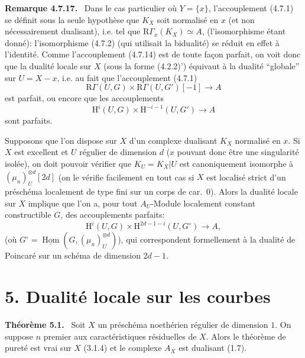 \documentclass[11pt]{article}
\newenvironment{statement}[1]{\par\medskip\noindent\textbf{#1.}\ }{\par\medskip}
\renewcommand{\H}{\mathrm{H}}
\DeclareMathOperator{\Hom}{Hom}
\newcommand{\R}{\mathrm{R}}
\providecommand{\uHom}{\underline{\Hom}}
\providecommand{\Hom}{\operatorname{Hom}}
\providecommand{\R}{\mathrm R}
\providecommand{\Hom}{\operatorname{Hom}}
\begin{document}
\begin{statement}{Remarque 4.7.17}
Dans le cas particulier où $Y=\{x\}$, l'accouplement (4.7.1) se définit sous la seule hypothèse que $K_X$ soit normalisé en $x$ (et non nécessairement dualisant), i.e. tel que $\R\Gamma_x(K_X)\simeq A$, (l'isomorphisme étant donné): l'isomorphisme (4.7.2) (qui utilisait la bidualité) se réduit en effet à l'identité. Comme l'accouplement (4.7.14) est de toute façon parfait, on voit donc que la dualité locale sur $X$ (sous la forme (4.2.2)') équivaut à la dualité ``globale'' sur $U=X-x$, i.e. au fait que l'accouplement (4.7.1)
\[
\R\Gamma(U,G)\times\R\Gamma(U,G')[-1]\longrightarrow A
\]
est parfait, ou encore que les accouplements
\[
\H^i(U,G)\times\H^{-i-1}(U,G')\longrightarrow A
\]
sont parfaits.

Supposons que l'on dispose sur $X$ d'un complexe dualisant $K_X$ normalisé en $x$. Si $X$ est excellent et $U$ régulier de dimension $d$ ($x$ pouvant donc être une singularité isolée), on doit pouvoir vérifier que $K_U=K_X|U$ est canoniquement isomorphe à $(\mu_n)_U^{\otimes d}[2d]$ (on le vérifie facilement en tout cas si $X$ est localisé strict d'un préschéma localement de type fini sur un corps de car.~0). Alors la dualité locale sur $X$ implique que l'on a, pour tout $A_U$-Module localement constant constructible $G$, des accouplements parfaits:
\[
\H^i(U,G)\times\H^{2d-1-i}(U,G^\circ)\longrightarrow A,
\]
(où $G^\circ=\uHom(G,(\mu_n)_U^{\otimes d})$), qui correspondent formellement à la dualité de Poincaré sur un schéma de dimension $2d-1$.
\end{statement}

\section*{5. Dualité locale sur les courbes}

\begin{statement}{Théorème 5.1}
Soit $X$ un préschéma noethérien régulier de dimension $1$. On suppose $n$ premier aux caractéristiques résiduelles de $X$. Alors le théorème de pureté est vrai sur $X$ (3.1.4) et le complexe $A_X$ est dualisant (1.7).
\end{statement}
\end{document}
